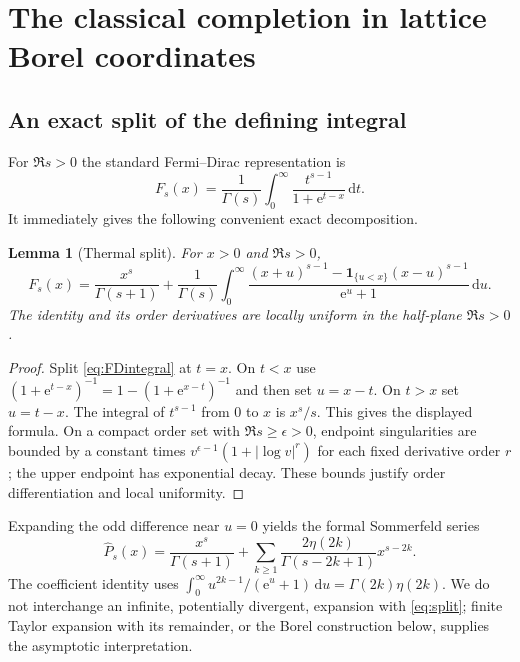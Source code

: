 \documentclass[11pt,a4paper]{article}
\newtheorem{lemma}[theorem]{Lemma}
\theoremstyle{definition}\newtheorem{definition}[theorem]{Definition}
\theoremstyle{remark}\newtheorem{remark}[theorem]{Remark}
\newcommand{\dd}{\,\mathrm d}
\newcommand{\ee}{\mathrm e}
\numberwithin{equation}{section}
\begin{document}
\section{The classical completion in lattice Borel coordinates}\label{sec:borel}

\subsection{An exact split of the defining integral}

For $\Re s>0$ the standard Fermi--Dirac representation is
\begin{equation}\label{eq:FDintegral}
 F_s(x)=\frac1{\Gamma(s)}
       \int_0^\infty\frac{t^{s-1}}{1+\ee^{t-x}}\dd t.
\end{equation}
It immediately gives the following convenient exact decomposition.

\begin{lemma}[Thermal split]\label{lem:split}
For $x>0$ and $\Re s>0$,
\begin{equation}\label{eq:split}
 F_s(x)=\frac{x^s}{\Gamma(s+1)}+
 \frac1{\Gamma(s)}\int_0^\infty
 \frac{(x+u)^{s-1}-\mathbf1_{\{u<x\}}(x-u)^{s-1}}
      {\ee^u+1}\dd u.
\end{equation}
The identity and its order derivatives are locally uniform in the half-plane
$\Re s>0$.
\end{lemma}
\begin{proof}
Split \eqref{eq:FDintegral} at $t=x$. On $t<x$ use
$(1+\ee^{t-x})^{-1}=1-(1+\ee^{x-t})^{-1}$ and then set $u=x-t$.
On $t>x$ set $u=t-x$. The integral of $t^{s-1}$ from $0$ to $x$ is
$x^s/s$. This gives the displayed formula. On a compact order set with
$\Re s\ge\epsilon>0$, endpoint singularities are bounded by a constant times
$v^{\epsilon-1}(1+|\log v|^r)$ for each fixed derivative order $r$;
the upper endpoint has exponential decay. These bounds justify order
differentiation and local uniformity.
\end{proof}

Expanding the odd difference near $u=0$ yields the formal Sommerfeld series
\begin{equation}\label{eq:Sommerfeld}
 \widehat P_s(x)=\frac{x^s}{\Gamma(s+1)}+
 \sum_{k\ge1}\frac{2\eta(2k)}{\Gamma(s-2k+1)}x^{s-2k}.
\end{equation}
The coefficient identity uses
$\int_0^\infty u^{2k-1}/(\ee^u+1)\dd u=\Gamma(2k)\eta(2k)$.
We do not interchange an infinite, potentially divergent, expansion with
\eqref{eq:split}; finite Taylor expansion with its remainder, or the Borel
construction below, supplies the asymptotic interpretation.
\end{document}
